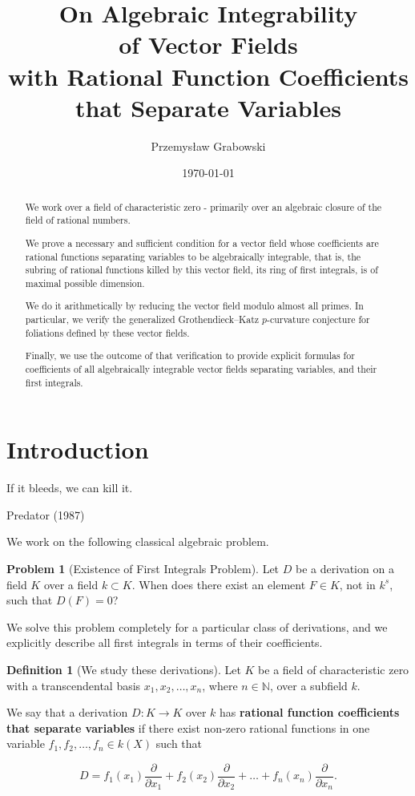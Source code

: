 \documentclass{amsart}
\title[Algebraic Integrability]{On Algebraic Integrability\\
of Vector Fields \\
with Rational Function Coefficients\\
that Separate Variables}
\author{Przemysław Grabowski}
\date{\today}
\theoremstyle{definition}
\newtheorem{defin}[thm]{Definition}
\newtheorem{problem}[thm]{Problem}
\begin{document}
\begin{abstract}
    We work over a field of characteristic zero - primarily over an algebraic closure of the field of rational numbers.
    
    We prove a necessary and sufficient condition for a vector field whose coefficients are rational functions separating variables to be algebraically integrable, that is, the subring of rational functions killed by this vector field, its ring of first integrals, is of maximal possible dimension. 
    
    We do it arithmetically by reducing the vector field modulo almost all primes.
    In particular, we verify the generalized Grothendieck--Katz $p$-curvature conjecture for foliations defined by these vector fields.

    Finally, we use the outcome of that verification to provide explicit formulas for coefficients of all algebraically integrable vector fields separating variables, and their first integrals.
\end{abstract}


\maketitle
\tableofcontents


\section{Introduction}
\epigraph{If it bleeds, we can kill it.}
{Predator (1987)}

We work on the following classical algebraic problem.

\begin{problem}[Existence of First Integrals Problem]\label{problem1}
    Let $D$ be a derivation on a field $K$ over a field $k\subset K$. When does there exist an element $F\in K$, not in $k^s$, such that $D(F)=0$?
\end{problem}

We solve this problem completely for a particular class of derivations, and we explicitly describe all first integrals in terms of their coefficients.

\begin{defin}[We study these derivations]
    Let $K$ be a field of characteristic zero with a transcendental basis $x_1,x_2,\ldots, x_n$, where $n\in \mathbb{N}$, over a subfield $k$.

    We say that a derivation $D:K\to K$ over $k$ has \textbf{rational function coefficients that separate variables} if there exist non-zero rational functions in one variable $f_1,f_2,\ldots,f_n \in k(X)$ such that

    \begin{equation}\label{eq: formula - definition}
    D= f_1(x_1)\frac{\partial}{\partial x_1}+f_2(x_2)\frac{\partial}{\partial x_2}+\ldots+f_n(x_n)\frac{\partial}{\partial x_n}.
\end{equation}
\end{defin}
\end{document}

